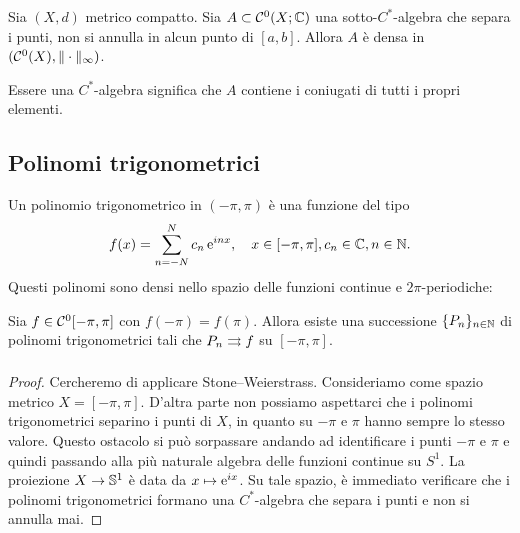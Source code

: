 \begin{theorem}
	Sia $(X,d)$ metrico compatto. Sia $A \subset \Czero(X; \C)$ una sotto-$C^*$-algebra che separa i punti, non si annulla in alcun punto di $[a,b]$.
	Allora $A$ è densa in $(\Czero(X), \|\cdot\|_\infty)$.
\end{theorem}

\begin{remark}
	Essere una $C^*$-algebra significa che $A$ contiene i coniugati di tutti i propri elementi.
\end{remark}

\subsection{Polinomi trigonometrici}
Un polinomio trigonometrico in $(-\pi,\pi)$ è una funzione del tipo
\begin{equation*}
	f(x) = \sum_{n=-N}^N c_n\,\e^{inx}, \quad x \in [-\pi,\pi], c_n \in \C, n \in \N.
\end{equation*}
Questi polinomi sono densi nello spazio delle funzioni continue e $2\pi$-periodiche:

\begin{lemma}
	Sia $f \in \Czero[-\pi,\pi]$ con $f(-\pi) = f(\pi)$.
	Allora esiste una successione $\{P_n\}_{n \in \N}$ di polinomi trigonometrici tali che $P_n \uniconv[] f$ su $[-\pi,\pi]$.
\end{lemma}
\begin{proof}
	Cercheremo di applicare Stone--Weierstrass.
	Consideriamo come spazio metrico $X = [-\pi,\pi]$. D'altra parte non possiamo aspettarci che i polinomi trigonometrici separino i punti di $X$, in quanto su $-\pi$ e $\pi$ hanno sempre lo stesso valore.
	Questo ostacolo si può sorpassare andando ad identificare i punti $-\pi$ e $\pi$ e quindi passando alla più naturale algebra delle funzioni continue su $S^1$. La proiezione $X \to \S^1$ è data da $x \mapsto \e^{ix}$.
	Su tale spazio, è immediato verificare che i polinomi trigonometrici formano una $C^*$-algebra che separa i punti e non si annulla mai.
\end{proof}

